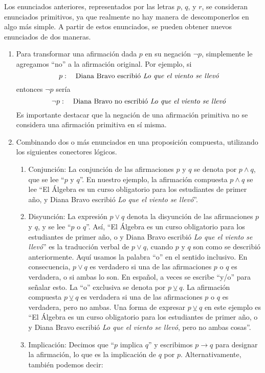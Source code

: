 Los enunciados anteriores, representados por las letras $p$, $q$, y $r$, se consideran enunciados primitivos, ya que realmente no hay manera de descomponerlos en algo más simple. A partir de estos enunciados, se pueden obtener nuevos enunciados de dos maneras.
\begin{enumerate}
    \item Para transformar una afirmación dada $p$ en su negación $\neg p$, simplemente le agregamos “no” a la afirmación original. Por ejemplo, si
    $$p: \quad \text{Diana Bravo escribió \emph{Lo que el viento se llevó}}$$
    entonces $\neg p$ sería
    $$\neg p: \quad \text{Diana Bravo no escribió \emph{Lo que el viento se llevó}}$$
    Es importante destacar que la negación de una afirmación primitiva no se considera una afirmación primitiva en sí misma.
    \item Combinando dos o más enunciados en una proposición compuesta, utilizando los siguientes conectores lógicos.
    \begin{enumerate}
        \item Conjunción: La conjunción de las afirmaciones $p$ y $q$ se denota por $p \land q$, que se lee “$p$ y $q$”. En nuestro ejemplo, la afirmación compuesta $p \land q$ se lee “El Álgebra es un curso obligatorio para los estudiantes de primer año, y Diana Bravo escribió \emph{Lo que el viento se llevó}”.
        \item Disyunción: La expresión $p \lor q$ denota la disyunción de las afirmaciones $p$ y $q$, y se lee “$p$ o $q$”. Así, “El Álgebra es un curso obligatorio para los estudiantes de primer año, o y Diana Bravo escribió \emph{Lo que el viento se llevó}” es la traducción verbal de $p \lor q$, cuando $p$ y $q$ son como se describió anteriormente. Aquí usamos la palabra “o” en el sentido inclusivo. En consecuencia, $p \lor q$ es verdadero si una de las afirmaciones $p$ o $q$ es verdadera, o si ambas lo son. En español, a veces se escribe “y/o” para señalar esto. La “o” exclusiva se denota por $p \veebar q$. La afirmación compuesta $p \veebar q$ es verdadera si una de las afirmaciones $p$ o $q$ es verdadera, pero no ambas. Una forma de expresar $p \veebar q$ en este ejemplo es “El Álgebra es un curso obligatorio para los estudiantes de primer año, o y Diana Bravo escribió \emph{Lo que el viento se llevó}, pero no ambas cosas”.
        \item Implicación: Decimos que “$p$ implica $q$” y escribimos $p \rightarrow q$ para designar la afirmación, lo que es la implicación de $q$ por $p$. Alternativamente, también podemos decir:

\end{enumerate}
\end{enumerate}
